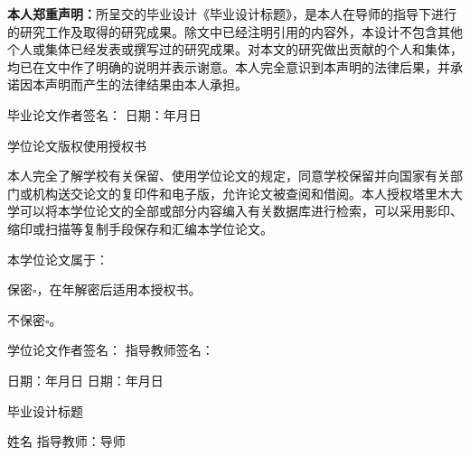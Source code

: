 \documentclass[a4paper,12pt]{ctexart}
\newcommand{\thesistitle}{毕业设计标题}
\newcommand{\studentname}{姓名}
\newcommand{\advisor}{导师}
\begin{document}
{\bfseries 本人郑重声明：}所呈交的毕业设计《\thesistitle》，是本人在导师的指导下进行的研究工作及取得的研究成果。除文中已经注明引用的内容外，本设计不包含其他个人或集体已经发表或撰写过的研究成果。对本文的研究做出贡献的个人和集体，均已在文中作了明确的说明并表示谢意。本人完全意识到本声明的法律后果，并承诺因本声明而产生的法律结果由本人承担。

\vspace{2cm}
\hfill 毕业论文作者签名：\underline{\makebox[3cm]{}} \hspace{1cm} 日期：\underline{\makebox[1cm]{}}年\underline{\makebox[1cm]{}}月\underline{\makebox[1cm]{}}日

\vspace{3cm}

\begin{center}
{\heiti\fontsize{16pt}{16pt}\selectfont 学位论文版权使用授权书}
\end{center}
\vspace{1cm}

本人完全了解学校有关保留、使用学位论文的规定，同意学校保留并向国家有关部门或机构送交论文的复印件和电子版，允许论文被查阅和借阅。本人授权塔里木大学可以将本学位论文的全部或部分内容编入有关数据库进行检索，可以采用影印、缩印或扫描等复制手段保存和汇编本学位论文。

\vspace{1cm}
本学位论文属于：

保\hspace{1em}密$\square$，在\underline{\makebox[2cm]{}}年解密后适用本授权书。

不保密$\square$。

\vspace{2cm}
学位论文作者签名：\underline{\makebox[3cm]{}} \hfill 指导教师签名：\underline{\makebox[3cm]{}}

日期：\underline{\makebox[1cm]{}}年\underline{\makebox[1cm]{}}月\underline{\makebox[1cm]{}}日 \hfill 日期：\underline{\makebox[1cm]{}}年\underline{\makebox[1cm]{}}月\underline{\makebox[1cm]{}}日

\clearpage

\thispagestyle{empty}
\begin{center}
{\heiti\fontsize{18pt}{18pt}\selectfont \thesistitle}
\end{center}
\vspace{0.5cm}
\begin{center}
\songti\fontsize{12pt}{12pt}\selectfont \studentname \hspace{2em} 指导教师：\advisor
\end{center}
\vspace{1cm}
\end{document}
